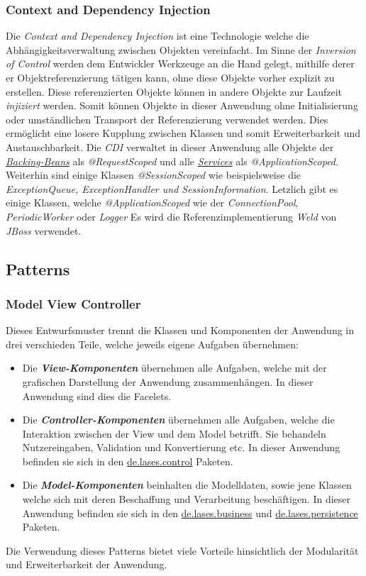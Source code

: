\subsubsection{Context and Dependency Injection}
Die \emph{Context and Dependency Injection} ist eine Technologie welche die
Abhängigkeitsverwaltung zwischen Objekten vereinfacht. Im Sinne der
\emph{Inversion of Control} werden dem Entwickler Werkzeuge an die Hand gelegt, mithilfe derer
er Objektreferenzierung tätigen kann, ohne diese Objekte vorher explizit zu erstellen.
Diese referenzierten Objekte können in andere Objekte zur Laufzeit \emph{injiziert} werden.
Somit können Objekte in dieser Anwendung ohne Initialisierung oder umständlichen Transport der Referenzierung
verwendet werden.
Dies ermöglicht eine losere Kupplung zwischen Klassen und somit Erweiterbarkeit
und Austauschbarkeit.
Die \emph{CDI} verwaltet in dieser Anwendung alle Objekte der \emph{\hyperref[arch:backing]{Backing-Beans}}
als \emph{@RequestScoped}
und alle \emph{\hyperref[arch:service]{Services}} als \emph{@ApplicationScoped}.
Weiterhin sind einige Klassen \emph{@SessionScoped} wie beispielsweise
die \emph{ExceptionQueue, ExceptionHandler und SessionInformation}.
Letzlich gibt es einige Klassen, welche
\emph{@ApplicationScoped} wie der \emph{ConnectionPool}, \emph{PeriodicWorker} oder \emph{Logger}%
Es wird die Referenzimplementierung \emph{Weld} von \emph{JBoss} verwendet.

\subsection{Patterns}\label{arch:patterns}

\subsubsection{Model View Controller}\label{arch:mvc}
Dieses Entwurfsmuster trennt die Klassen und Komponenten der Anwendung in drei
verschieden Teile, welche jeweils eigene Aufgaben übernehmen:
\begin{itemize}
    \item Die \emph{\textbf{View-Komponenten}} übernehmen alle Aufgaben,
    welche mit der grafischen Darstellung der Anwendung zusammenhängen.
    In dieser Anwendung sind dies die Facelets. %
    \item Die \emph{\textbf{Controller-Komponenten}} übernehmen alle Aufgaben,
    welche die Interaktion zwischen der View und dem Model betrifft. Sie behandeln
    Nutzereingaben, Validation und Konvertierung etc. In dieser Anwendung befinden sie
    sich in den \hyperref[arch:control]{de.lases.control} Paketen.
    \item Die \emph{\textbf{Model-Komponenten}} beinhalten die Modelldaten, sowie jene
    Klassen welche sich mit deren Beschaffung und Verarbeitung beschäftigen. In dieser
    Anwendung befinden sie sich in den \hyperref[arch:business]{de.lases.business}
    und \hyperref[arch:persistence]{de.lases.persistence} Paketen.
\end{itemize}
Die Verwendung dieses Patterns bietet viele Vorteile hinsichtlich der Modularität
und Erweiterbarkeit der Anwendung.

